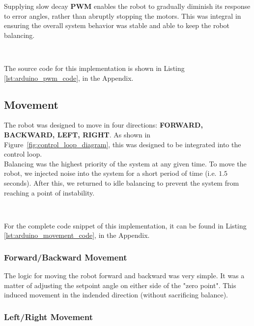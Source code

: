 \documentclass{article}
\begin{document}
\begin{minipage}{\linewidth}
    Supplying slow decay \textbf{PWM} enables the robot to gradually diminish its response to error angles, rather than abruptly stopping the motors.
    This was integral in ensuring the overall system behavior was stable and able to keep the robot balancing.

    \

    The source code for this implementation is shown in Listing \ref{lst:arduino_pwm_code}, in the Appendix.
\end{minipage}

\subsection{Movement}
\label{sec:movement}

\begin{minipage}{\linewidth}
    The robot was designed to move in four directions: \textbf{FORWARD, BACKWARD, LEFT, RIGHT}.
    As shown in Figure~\ref{fig:control_loop_diagram}, this was designed to be integrated into the control loop.  \\

    Balancing was the highest priority of the system at any given time. To move the robot, we injected noise into the system for a short period of time
    (i.e. $1.5$ seconds). After this, we returned to idle balancing to prevent the system from reaching a point of instability.

    \

    For the complete code snippet of this implementation, it can be found in Listing \ref{lst:arduino_movement_code}, in the Appendix.
\end{minipage}

\subsubsection{Forward/Backward Movement}

\begin{minipage}{\linewidth}
    The logic for moving the robot forward and backward was very simple. It was a matter of adjusting the setpoint angle on either side of the "zero point".
    This induced movement in the indended direction (without sacrificing balance). \\
\end{minipage}

\subsubsection{Left/Right Movement}
\end{document}
